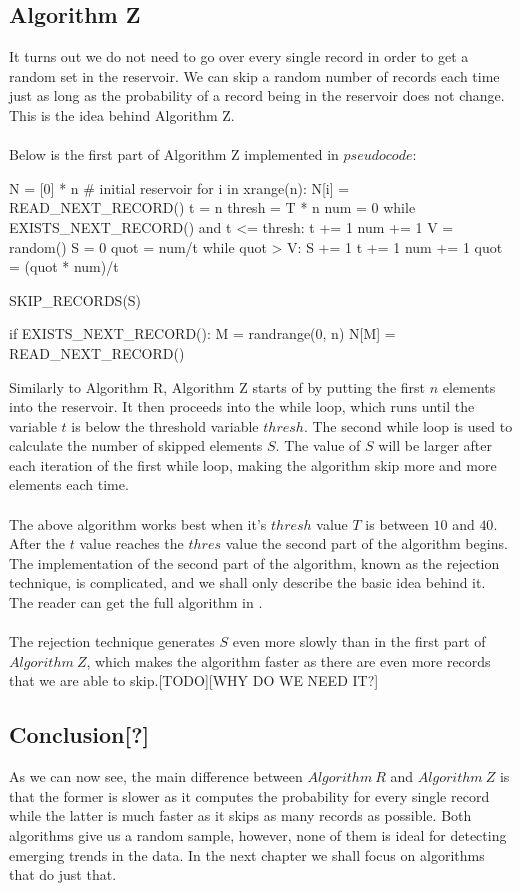 \documentclass[journal]{IEEEtran/IEEEtran}
\begin{document}
\subsection{Algorithm Z}
It turns out we do not need to go over every single record in order to get a random set in the reservoir. We can skip a random number of records each time just as long as the probability of a record being in the reservoir does not change. This is the idea behind Algorithm Z.\\ \\
Below is the first part of Algorithm Z implemented in $pseudocode$:\\
\begin{code}
N = [0] * n # initial reservoir
for i in xrange(n):
	N[i] = READ_NEXT_RECORD()
t = n
thresh = T * n
num = 0
while EXISTS_NEXT_RECORD() and t <= thresh:
	t += 1
	num += 1
	V = random()
	S = 0
	quot = num/t
	while quot > V:
		S += 1
		t += 1
		num += 1
		quot = (quot * num)/t
	
	SKIP_RECORDS(S)
	
	if EXISTS_NEXT_RECORD():
		M = randrange(0, n)
		N[M] = READ_NEXT_RECORD()
		
\end{code}
Similarly to Algorithm R, Algorithm Z starts of by putting the first $n$ elements into the reservoir. It then proceeds into the while loop, which runs until the variable $t$ is below the threshold variable $thresh$. The second while loop is used to calculate the number of skipped elements $S$. The value of $S$ will be larger after each iteration of the first while loop, making the algorithm skip more and more elements each time.\\\\ 
The above algorithm works best when it's $thresh$ value $T$ is between $10$ and $40$. After the $t$ value reaches the $thres$ value the second part of the algorithm begins. The implementation of the second part of the algorithm, known as the rejection technique, is complicated, and we shall only describe the basic idea behind it. The reader can get the full algorithm in \cite{reservoir85}.\\\\
The rejection technique generates $S$ even more slowly than in the first part of $Algorithm\ Z$, which makes the algorithm faster as there are even more records that we are able to skip.[TODO][WHY DO WE NEED IT?]
\subsection{Conclusion[?]}
As we can now see, the main difference between $Algorithm\ R$ and $Algorithm\ Z$ is that the former is slower as it computes the probability for every single record while the latter is much faster as it skips as many records as possible. Both algorithms give us a random sample, however, none of them is ideal for detecting emerging trends in the data. In the next chapter we shall focus on algorithms that do just that.
\end{document}

